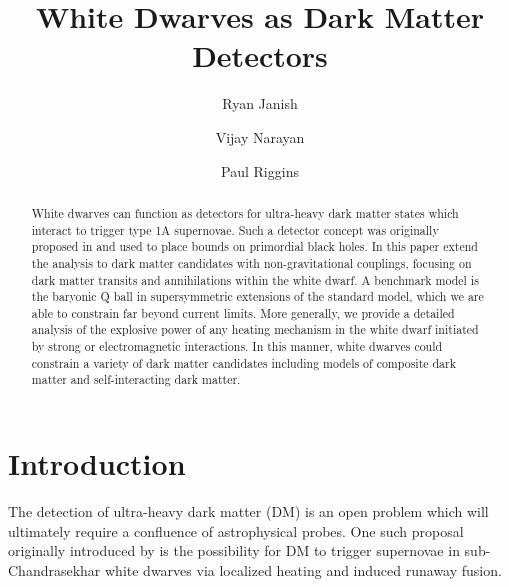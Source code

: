 \documentclass[twocolumn,showpacs,preprintnumbers,amsmath,amssymb,prl]{revtex4}
\begin{document}
\title{White Dwarves as Dark Matter Detectors}


\author{Ryan Janish}

\author{Vijay Narayan}

\author{Paul Riggins}

\begin{abstract}

White dwarves can function as detectors for ultra-heavy dark matter states which interact to trigger type 1A supernovae. Such a detector concept was originally proposed in \cite{Graham:2015apa} and used to place bounds on primordial black holes. In this paper extend the analysis to dark matter candidates with non-gravitational couplings, focusing on dark matter transits and annihilations within the white dwarf. A benchmark model is the baryonic Q ball in supersymmetric extensions of the standard model, which we are able to constrain far beyond current limits. More generally, we provide a detailed analysis of the explosive power of any heating mechanism in the white dwarf initiated by strong or electromagnetic interactions. In this manner, white dwarves could constrain a variety of dark matter candidates including models of composite dark matter and self-interacting dark matter.  

\end{abstract}
\maketitle


\section{Introduction}

The detection of ultra-heavy dark matter (DM) is an open problem which will ultimately require a confluence of astrophysical probes. One such proposal originally introduced by \cite{Graham:2015apa} is the possibility for DM to trigger supernovae in sub-Chandrasekhar white dwarves via localized heating and induced runaway fusion. 
\end{document}
